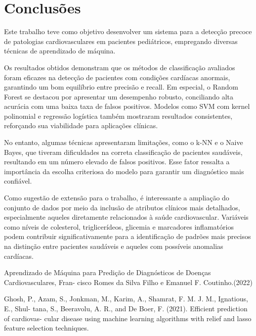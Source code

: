 \documentclass[10pt, conference, compsocconf]{IEEEtran}
\begin{document}
\section{Conclusões}

Este trabalho teve como objetivo desenvolver um sistema para a detecção precoce de patologias cardiovasculares em pacientes pediátricos, empregando diversas técnicas de aprendizado de máquina. 

Os resultados obtidos demonstram que os métodos de classificação avaliados foram eficazes na detecção de pacientes com condições cardíacas anormais, garantindo um bom equilíbrio entre precisão e recall. Em especial, o Random Forest se destacou por apresentar um desempenho robusto, conciliando alta acurácia com uma baixa taxa de falsos positivos. Modelos como SVM com kernel polinomial e regressão logística também mostraram resultados consistentes, reforçando sua viabilidade para aplicações clínicas.

No entanto, algumas técnicas apresentaram limitações, como o k-NN e o Naive Bayes, que tiveram dificuldades na correta classificação de pacientes saudáveis, resultando em um número elevado de falsos positivos. Esse fator ressalta a importância da escolha criteriosa do modelo para garantir um diagnóstico mais confiável.

Como sugestão de extensão para o trabalho, é interessante a ampliação do conjunto de dados por meio da inclusão de atributos clínicos mais detalhados, especialmente aqueles diretamente relacionados à saúde cardiovascular.
 Variáveis como níveis de colesterol, triglicerídeos, glicemia e marcadores inflamatórios podem contribuir significativamente para a identificação de padrões mais precisos na distinção entre 
 pacientes saudáveis e aqueles com possíveis anomalias cardíacas. 
\begin{thebibliography}{1}

  Aprendizado de Máquina para
Predição de Diagnósticos de Doenças Cardiovasculares, Fran-
cisco Romes da Silva Filho e Emanuel F. Coutinho.(2022)

Ghosh, P., Azam, S., Jonkman, M., Karim, A., Shamrat, F. M. J. M., Ignatious, E., Shul-
tana, S., Beeravolu, A. R., and De Boer, F. (2021). Efficient prediction of cardiovas-
cular disease using machine learning algorithms with relief and lasso feature selection
techniques. 

    
  
  \end{thebibliography}
\end{document}
